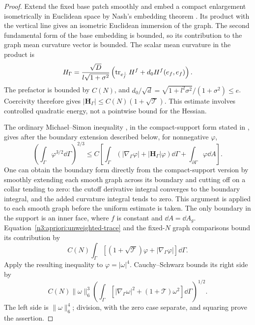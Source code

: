 \begin{proof}
Extend the fixed base patch smoothly and embed a compact enlargement
isometrically in Euclidean space by Nash's embedding theorem
\cite[Theorem~2, p.~59]{Nash1956}.  Its product with the vertical
line gives an isometric Euclidean immersion of the graph.  The
second fundamental form of the base embedding is bounded, so its
contribution to the graph mean curvature vector is bounded.
The scalar mean curvature in the product is
\[
 H_\Gamma=
 \frac{\sqrt D}{l\sqrt{1+\sigma^2}}
       \left(\operatorname{tr}_{e_f^\perp}H^f+d_0H^f(e_f,e_f)\right).
\]
The prefactor is bounded by $C(N)$, and
$d_0/\sqrt d=\sqrt{1+l^2\sigma^2}/(1+\sigma^2)\le e$.
Coercivity therefore gives
$|\boldsymbol H_\Gamma|\le C(N)(1+\sqrt{\mathcal T})$.
This estimate involves controlled quadratic energy, not a pointwise
bound for the Hessian.

The ordinary Michael--Simon inequality \cite{MichaelSimon1973}, in
the compact-support form stated in
\cite[Chapter~4, Section~5, Theorem~5.7, p.~98]{Simon2014}, gives after the
boundary extension described below, for nonnegative $\varphi$,
\[
 \left(\int_\Gamma\varphi^{3/2}\dd\Gamma\right)^{2/3}
 \le C\left[
       \int_\Gamma(|\nabla_\Gamma\varphi|
                          +|\boldsymbol H_\Gamma|\varphi)\dd\Gamma
       +\int_{\partial\Gamma}\varphi\dd A\right].
\]
One can obtain the boundary form directly from the compact-support
version by smoothly extending each smooth graph across its boundary
and cutting off on a collar tending to zero: the cutoff derivative
integral converges to the boundary integral, and the added curvature
integral tends to zero.  This argument is applied to each smooth
graph before the uniform estimate is taken.  The only boundary in
the support is an inner face, where $f$ is constant and
$\dd A=\dd A_g$.  Equation~\eqref{n3:apriori:unweighted-trace} and
the fixed-$N$ graph comparisons bound its contribution by
\[
 C(N)\int_\Gamma
       [(1+\sqrt{\mathcal T})\varphi
                               +|\nabla_\Gamma\varphi|]\dd\Gamma.
\]
Apply the resulting inequality to $\varphi=|\omega|^4$.
Cauchy--Schwarz bounds its right side by
\[
 C(N)\|\omega\|_6^3
 \left(\int_\Gamma
       [|\nabla_\Gamma\omega|^2+(1+\mathcal T)\omega^2]
                                      \dd\Gamma\right)^{1/2}.
\]
The left side is $\|\omega\|_6^4$; division, with the zero case
separate, and squaring prove the assertion.
\end{proof}

